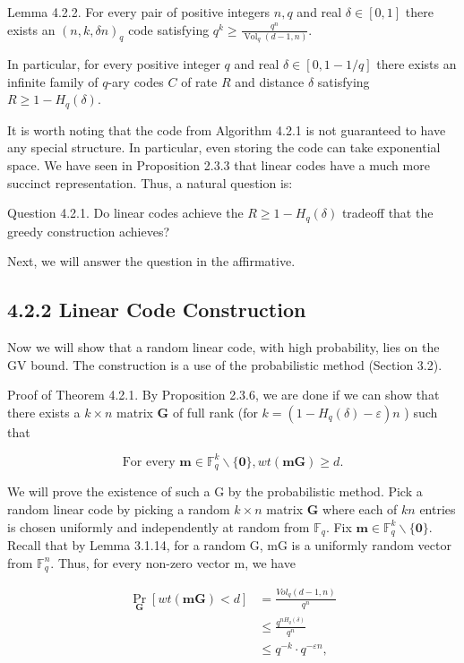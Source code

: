 \documentclass[10pt]{article}
\begin{document}
Lemma 4.2.2. For every pair of positive integers $n, q$ and real $\delta \in[0,1]$ there exists an $(n, k, \delta n)_{q}$ code satisfying $q^{k} \geq \frac{q^{n}}{\operatorname{Vol}_{q}(d-1, n)}$.

In particular, for every positive integer $q$ and real $\delta \in[0,1-1 / q]$ there exists an infinite family of $q$-ary codes $C$ of rate $R$ and distance $\delta$ satisfying $R \geq 1-H_{q}(\delta)$.

It is worth noting that the code from Algorithm 4.2.1 is not guaranteed to have any special structure. In particular, even storing the code can take exponential space. We have seen in Proposition 2.3.3 that linear codes have a much more succinct representation. Thus, a natural question is:

Question 4.2.1. Do linear codes achieve the $R \geq 1-H_{q}(\delta)$ tradeoff that the greedy construction achieves?

Next, we will answer the question in the affirmative.

\subsection*{4.2.2 Linear Code Construction}
Now we will show that a random linear code, with high probability, lies on the GV bound. The construction is a use of the probabilistic method (Section 3.2).

Proof of Theorem 4.2.1. By Proposition 2.3.6, we are done if we can show that there exists a $k \times n$ matrix $\mathbf{G}$ of full rank (for $k=\left(1-H_{q}(\delta)-\varepsilon\right) n$ ) such that

$$
\text { For every } \mathbf{m} \in \mathbb{F}_{q}^{k} \backslash\{\mathbf{0}\}, w t(\mathbf{m G}) \geq d \text {. }
$$

We will prove the existence of such a G by the probabilistic method. Pick a random linear code by picking a random $k \times n$ matrix $\mathbf{G}$ where each of $k n$ entries is chosen uniformly and independently at random from $\mathbb{F}_{q}$. Fix $\mathbf{m} \in \mathbb{F}_{q}^{k} \backslash\{\mathbf{0}\}$. Recall that by Lemma 3.1.14, for a random G, mG is a uniformly random vector from $\mathbb{F}_{q}^{n}$. Thus, for every non-zero vector m, we have


\begin{align*}
\underset{\mathbf{G}}{\operatorname{Pr}}[w t(\mathbf{m G})<d] & =\frac{V o l_{q}(d-1, n)}{q^{n}} \\
& \leq \frac{q^{n H_{q}(\delta)}}{q^{n}}  \tag{4.5}\\
& \leq q^{-k} \cdot q^{-\varepsilon n}, \tag{4.6}
\end{align*}
\end{document}
